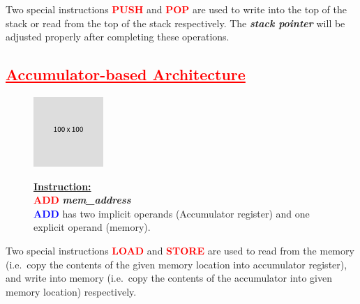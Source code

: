 \documentclass[
  14pt,
  a4paper,
  DIV=11,
  numbers=noendperiod,
  headinclude=true,
  footinclude=true]{scrreprt}
\begin{document}
\begin{tcolorbox}[colback=boxbodycol, colframe=boxbodycol]
Two special instructions \textcolor{red}{\textbf{PUSH}} and
\textcolor{red}{\textbf{POP}} are used to write into the top of the
stack or read from the top of the stack respectively. The
\textbf{\emph{stack pointer}} will be adjusted properly after completing
these operations.

\end{tcolorbox}

\subsection{\texorpdfstring{\textcolor{red}{\underline{Accumulator-based Architecture}}}{}}\label{section-1}

\begin{figure}[H]

\begin{minipage}{0.40\linewidth}

\includegraphics{index_files/mediabag/FiKGhYhhIWJYiBgWIoaF.png}\end{minipage}%
%
\begin{minipage}{0.60\linewidth}

\begin{tcolorbox}[colback=boxbodycol, colframe=boxbodycol]
\textbf{\underline{Instruction:}}\\
\textcolor{red}{\textbf{ADD}} \textbf{\emph{mem\_address}}\\
\textcolor{blue}{\textbf{ADD}} has two implicit operands (Accumulator
register) and one explicit operand (memory).

\end{tcolorbox}

\end{minipage}%

\end{figure}%

\begin{tcolorbox}[colback=boxbodycol, colframe=boxbodycol]
Two special instructions \textcolor{red}{\textbf{LOAD}} and
\textcolor{red}{\textbf{STORE}} are used to read from the memory
(i.e.~copy the contents of the given memory location into accumulator
register), and write into memory (i.e.~copy the contents of the
accumulator into given memory location) respectively.

\end{tcolorbox}
\end{document}
